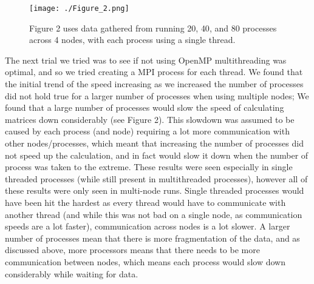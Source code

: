 \documentclass[11pt,leqno]{article}
\begin{document}
\begin{wrapfigure}{l}{0.6\textwidth}
  \centering
  \hspace{-12mm}
\texttt{[image: ./Figure\_2.png]}
\caption{Figure 2 uses data gathered from running \textcolor{CtpBlue}{20}, \textcolor{CtpPeach}{40}, and \textcolor{CtpGreen}{80} processes across 4 nodes, with each process using a single thread.}
\end{wrapfigure}

The next trial we tried was to see if not using OpenMP multithreading was optimal, and so we tried creating a MPI process for each thread. We found that the initial trend of the speed increasing as we increased the number of processes did not hold true for a larger number of processes when using multiple nodes; We found that a large number of processes would slow the speed of calculating matrices down considerably (see Figure 2). This slowdown was assumed to be caused by each process (and node) requiring a lot more communication with other nodes/processes, which meant that increasing the number of processes did not speed up the calculation, and in fact would slow it down when the number of process was taken to the extreme. These results were seen especially in single threaded processes (while still present in multithreaded processes), however all of these results were only seen in multi-node runs. Single threaded processes would have been hit the hardest as every thread would have to communicate with another thread (and while this was not bad on a single node, as communication speeds are a lot faster), communication across nodes is a lot slower. A larger number of processes mean that there is more fragmentation of the data, and as discussed above, more processors means that there needs to be more communication between nodes, which means each process would slow down considerably while waiting for data.
\end{document}
